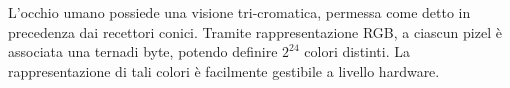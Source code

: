 \documentclass{subfiles}
\begin{document}
L'occhio umano possiede una visione tri-cromatica, permessa come detto in precedenza dai recettori conici.
Tramite rappresentazione RGB, a ciascun pizel è associata una terna\footnotemark[3] di byte, potendo definire \(2^{24}\) colori distinti.
La rappresentazione di tali colori è facilmente gestibile a livello hardware.

\end{document}
